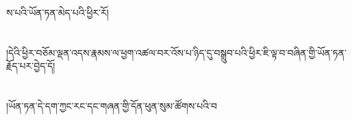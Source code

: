 ས་པའི་ཡོན་ཏན་མེད་པའི་ཕྱིར་རོ།\chapter{ }།དེའི་ཕྱིར་བཅོམ་ལྡན་འདས་རྣམས་ལ་ཕྱག་འཚལ་བར་འོས་པ་ཉིད་དུ་བསྒྲུབ་པའི་ཕྱིར་ཇི་ལྟ་བ་བཞིན་གྱི་ཡོན་ཏན་རྗོད་པར་བྱེད་དོ།\chapter{ }།ཡོན་ཏན་དེ་དག་ཀྱང་རང་དང་གཞན་གྱི་དོན་ཕུན་སུམ་ཚོགས་པའི་བ